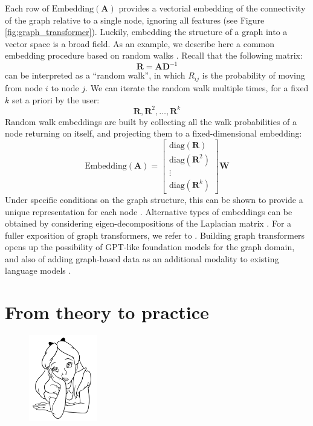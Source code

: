 Each row of $\text{Embedding}(\mathbf{A})$ provides a vectorial embedding of the connectivity of the graph relative to a single node, ignoring all features (see Figure \ref{fig:graph_transformer}). Luckily, embedding the structure of a graph into a vector space is a broad field. As an example, we describe here a common embedding procedure based on random walks \cite{dwivedi2021graph}. Recall that the following matrix:
%
$$
\mathbf{R} =\mathbf{A}\mathbf{D}^{-1}
$$
%
can be interpreted as a “random walk”, in which $R_{ij}$ is the probability of moving from node $i$ to node $j$. We can iterate the random walk multiple times, for a fixed $k$ set a priori by the user:
%
$$
\mathbf{R}, \mathbf{R}^2, \ldots,\mathbf{R}^k
$$
%
Random walk embeddings are built by collecting all the walk probabilities of a node returning on itself, and projecting them to a fixed-dimensional embedding:
%
$$
\text{Embedding}(\mathbf{A})=\begin{bmatrix} \text{diag}(\mathbf{R}) \\ \text{diag}(\mathbf{R}^2) \\ \vdots \\ \text{diag}(\mathbf{R}^k)\end{bmatrix}\mathbf{W}
$$
%
Under specific conditions on the graph structure, this can be shown to provide a unique representation for each node \cite{dwivedi2021graph}. Alternative types of embeddings can be obtained by considering eigen-decompositions of the Laplacian matrix \cite{lim2022sign}. For a fuller exposition of graph transformers, we refer to \cite{muller2023attending}. Building graph transformers opens up the possibility of GPT-like foundation models for the graph domain, and also of adding graph-based data as an additional modality to existing language models \cite{maoposition}.

\section*{From theory to practice}

\begin{figure}
\vspace{-5em}\includegraphics[width=3.0cm]{images/shutterstock_2075221579.jpg}
\vspace{-2em}
\end{figure}

